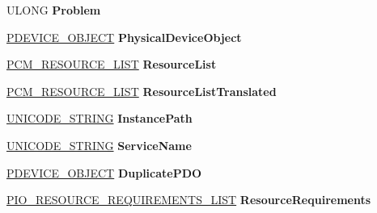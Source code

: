\begin{DoxyCompactItemize}
U\+L\+O\+NG {\bfseries Problem}
\item 
\mbox{\label{struct___d_e_v_i_c_e___n_o_d_e_a500b45022d89f965df144b9851b2f789}} 
\hyperlink{struct___d_e_v_i_c_e___o_b_j_e_c_t}{P\+D\+E\+V\+I\+C\+E\+\_\+\+O\+B\+J\+E\+CT} {\bfseries Physical\+Device\+Object}
\item 
\mbox{\label{struct___d_e_v_i_c_e___n_o_d_e_a75e12d1e431f1575caa230c5e3ff9ec4}} 
\hyperlink{struct___c_m___r_e_s_o_u_r_c_e___l_i_s_t}{P\+C\+M\+\_\+\+R\+E\+S\+O\+U\+R\+C\+E\+\_\+\+L\+I\+ST} {\bfseries Resource\+List}
\item 
\mbox{\label{struct___d_e_v_i_c_e___n_o_d_e_aa5e8ab365a5f3d459f7bf8b629b3c4ea}} 
\hyperlink{struct___c_m___r_e_s_o_u_r_c_e___l_i_s_t}{P\+C\+M\+\_\+\+R\+E\+S\+O\+U\+R\+C\+E\+\_\+\+L\+I\+ST} {\bfseries Resource\+List\+Translated}
\item 
\mbox{\label{struct___d_e_v_i_c_e___n_o_d_e_aace8a08cf164515efce24d9854a2b204}} 
\hyperlink{struct___u_n_i_c_o_d_e___s_t_r_i_n_g}{U\+N\+I\+C\+O\+D\+E\+\_\+\+S\+T\+R\+I\+NG} {\bfseries Instance\+Path}
\item 
\mbox{\label{struct___d_e_v_i_c_e___n_o_d_e_a132f6cdeac01f3da7c08863a1815c945}} 
\hyperlink{struct___u_n_i_c_o_d_e___s_t_r_i_n_g}{U\+N\+I\+C\+O\+D\+E\+\_\+\+S\+T\+R\+I\+NG} {\bfseries Service\+Name}
\item 
\mbox{\label{struct___d_e_v_i_c_e___n_o_d_e_aa78b2970856cc15894b621c4010be84a}} 
\hyperlink{struct___d_e_v_i_c_e___o_b_j_e_c_t}{P\+D\+E\+V\+I\+C\+E\+\_\+\+O\+B\+J\+E\+CT} {\bfseries Duplicate\+P\+DO}
\item 
\mbox{\label{struct___d_e_v_i_c_e___n_o_d_e_a6d4217d4c3c2d62ecd4bd20cb628421a}} 
\hyperlink{struct___i_o___r_e_s_o_u_r_c_e___r_e_q_u_i_r_e_m_e_n_t_s___l_i_s_t}{P\+I\+O\+\_\+\+R\+E\+S\+O\+U\+R\+C\+E\+\_\+\+R\+E\+Q\+U\+I\+R\+E\+M\+E\+N\+T\+S\+\_\+\+L\+I\+ST} {\bfseries Resource\+Requirements}
\item 
\mbox{\label{struct___d_e_v_i_c_e___n_o_d_e_a5bdd75b5ce584d9593e021f49f1272d0}} 

\end{DoxyCompactItemize}
